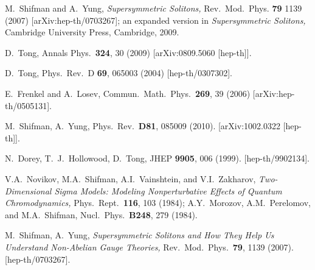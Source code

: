 \documentclass[epsfig,12pt]{article}
\begin{document}
\begin{thebibliography}{99}
M.~Shifman and A.~Yung,
{\sl Supersymmetric Solitons,}
Rev.\ Mod.\ Phys. {\bf 79} 1139 (2007)
[arXiv:hep-th/0703267]; an expanded version in {\sl Supersymmetric Solitons,}
Cambridge University Press, Cambridge, 2009.

D.~Tong,
  Annals Phys.\  {\bf 324}, 30 (2009)
  [arXiv:0809.5060 [hep-th]].

D.~Tong,
Phys.\ Rev.\ D {\bf 69}, 065003 (2004)
[hep-th/0307302].
  
E.~Frenkel and A.~Losev,
  Commun.\ Math.\ Phys.\  {\bf 269}, 39 (2006)
  [arXiv:hep-th/0505131].
  
  M.~Shifman, A.~Yung,
  Phys.\ Rev.\  {\bf D81}, 085009 (2010).
  [arXiv:1002.0322 [hep-th]].

  N.~Dorey, T.~J.~Hollowood, D.~Tong,
  JHEP {\bf 9905}, 006 (1999).
  [hep-th/9902134].

  V.A.~Novikov, M.A.~Shifman, A.I.~Vainshtein, and V.I.~Zakharov,
 {\em Two-Dimensional Sigma Models: Modeling Nonperturbative Effects of Quantum Chromodynamics,}
  Phys.\ Rept.\  {\bf 116}, 103 (1984);  A.Y.~Morozov, A.M.~Perelomov, and M.A.~Shifman,
  Nucl.\ Phys.\  {\bf B248}, 279 (1984).
  
  M.~Shifman, A.~Yung,
{\em Supersymmetric Solitons and How They Help Us Understand Non-Abelian Gauge Theories,}
  Rev.\ Mod.\ Phys.\  {\bf 79}, 1139 (2007).
  [hep-th/0703267].

\end{thebibliography}
\end{document}
